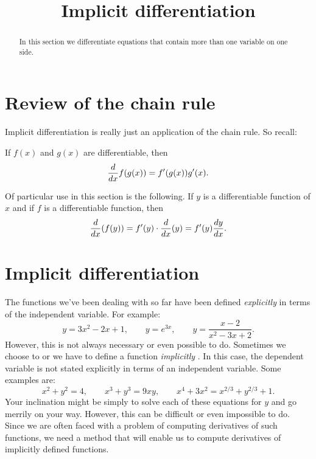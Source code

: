 \documentclass{ximera}
\title[Dig-In:]{Implicit differentiation}
\begin{document}
\begin{abstract}
In this section we differentiate equations that contain more than one variable on one side.
\end{abstract}
\maketitle
\section{Review of the chain rule}

Implicit differentiation is really just an application of the chain rule.
So recall:

\begin{theorem}
If $f(x)$ and $g(x)$ are differentiable, then
\[
\ddx f(g(x)) = f'(g(x))g'(x).
\]
\end{theorem}

Of particular use in this section is the following.  
If $y$ is a differentiable function of $x$ and if $f$ is a differentiable function, then
\[
\ddx (f(y)) = f'(y) \cdot \ddx (y) = f'(y) \dd[y]{x}.
\]


\section{Implicit differentiation}

The functions we've been dealing with so far have been
defined \textit{explicitly}
 in terms of the independent
variable. For example:
\[
y=3x^2-2x+1,\qquad y=e^{3x}, \qquad y = \frac{x-2}{x^2-3x+2}.
\]
However, this is not always  necessary or even possible to do. Sometimes we choose to or we have to define a function  \textit{implicitly
 }. In this case, the dependent variable is not stated
explicitly in terms of an independent variable. Some examples are:
\[
x^2+y^2 = 4,\qquad x^3+y^3 = 9xy, \qquad x^4+3x^2 = x^{2/3}+y^{2/3} + 1.
\]
Your inclination might be simply to solve each of these equations for $y$ and go
merrily on your way. However, this can be difficult or even impossible to do.
Since we are often faced with a problem of computing derivatives of such functions,
we need a  method that will enable us to compute derivatives of implicitly defined functions.
  
\end{document}

